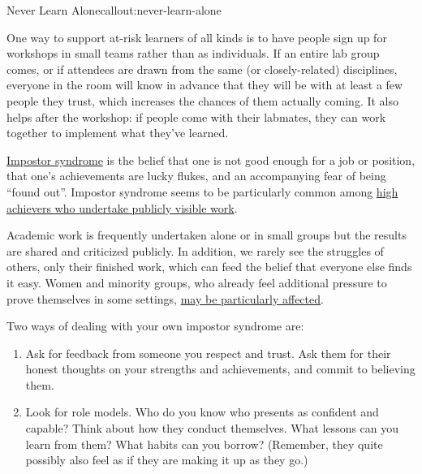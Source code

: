 \begin{callout}{Never Learn Alone}{callout:never-learn-alone}

One way to support at-risk learners of all kinds is to have people
sign up for workshops in small teams rather than as individuals. If an
entire lab group comes, or if attendees are drawn from the same (or
closely-related) disciplines, everyone in the room will know in
advance that they will be with at least a few people they trust, which
increases the chances of them actually coming. It also helps after the
workshop: if people come with their labmates, they can work together
to implement what they've learned.

\end{callout}


\href{https://en.wikipedia.org/wiki/Impostor\_syndrome}{Impostor
syndrome} is the belief that one is not good enough for a job or
position, that one's achievements are lucky flukes, and an
accompanying fear of being ``found out''. Impostor syndrome seems to
be particularly common among
\href{https://www.usenix.org/blog/impostor-syndrome-proof-yourself-and-your-community}{high
achievers who undertake publicly visible work}.

Academic work is frequently undertaken alone or in small groups but
the results are shared and criticized publicly. In addition, we rarely
see the struggles of others, only their finished work, which can feed
the belief that everyone else finds it easy. Women and minority
groups, who already feel additional pressure to prove themselves in
some settings,
\href{http://www.paulineroseclance.com/pdf/ip\_high\_achieving\_women.pdf}{may
be particularly affected}.

Two ways of dealing with your own impostor syndrome are:

\begin{enumerate}

\item
  Ask for feedback from someone you respect and trust. Ask them for
  their honest thoughts on your strengths and achievements, and commit
  to believing them.

\item
  Look for role models. Who do you know who presents as confident and
  capable? Think about how they conduct themselves. What lessons can
  you learn from them? What habits can you borrow? (Remember, they
  quite possibly also feel as if they are making it up as they go.)

\end{enumerate}

